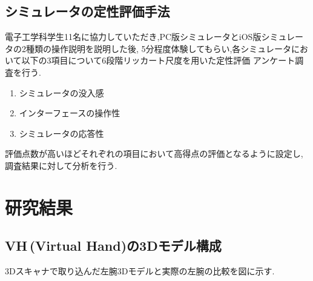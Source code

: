 \documentclass{ltjsreport}
\begin{document}
	\section{シミュレータの定性評価手法}
		電子工学科学生11名に協力していただき,PC版シミュレータとiOS版シミュレータの2種類の操作説明を説明した後,
		5分程度体験してもらい,各シミュレータにおいて以下の3項目について6段階リッカート尺度を用いた定性評価
		アンケート調査を行う.
		\vspace{-2pt}
		\begin{enumerate}
			\item シミュレータの没入感
			\item インターフェースの操作性
			\item シミュレータの応答性
		\end{enumerate}
		\vspace{-2pt}
		評価点数が高いほどそれぞれの項目において高得点の評価となるように設定し,調査結果に対して分析を行う.

\chapter{研究結果}
	\section{VH\,(Virtual Hand)の3Dモデル構成}
		3Dスキャナで取り込んだ左腕3Dモデルと実際の左腕の比較を図に示す.
\end{document}

